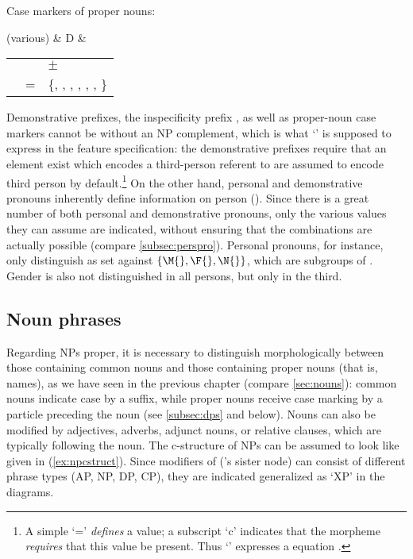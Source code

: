 \a\label{ex:dmorphlex-propn}Case markers of proper nouns:\medskip	
	
	\begin{tabu} {}
	(various)
		& D
		& \begin{tabular}[t]{l l l}
			\ups{\Anim} & \req{} & $\pm$ \\
			\ups{\Case} & = & \{\Aarg{}, \Parg{}, \Dat{}, \Gen{}, 
				\Loc{}, \Ins{}, \Caus{}\} \\
		\end{tabular}
	\end{tabu}\medskip
	
\xe

Demonstrative prefixes, the inspecificity prefix , as well as 
proper-noun case markers cannot be without an NP complement, which is what 
`\req{}' is supposed to express in the feature specification: the demonstrative 
prefixes require that an element exist which encodes a third-person referent to 
are assumed to encode third person by default.\footnote{A simple `=' 
\emph{defines} a value; a subscript `c' indicates that the morpheme 
\emph{requires} that this value be present. Thus `\req{}' expresses a 
 equation \citep[59--61]{bresnan2016}.} On the other hand, 
personal and demonstrative pronouns inherently define information on person 
(\Pers{}). Since there is a great number of both personal and demonstrative 
pronouns, only the various values they can assume are indicated, without 
ensuring that the combinations are actually possible (compare 
\autoref{subsec:perspro}). Personal pronouns, for instance, only distinguish 
\Inan{} as set against $\{\M{}, \F{}, \N{}\}$, which are subgroups of \An{}. 
Gender is also not distinguished in all persons, but only in the third.

\subsection{Noun phrases}

Regarding NPs proper, it is necessary to distinguish morphologically between 
those containing common nouns and those containing proper nouns (that is,  
names), as we have seen in the previous chapter (compare \autoref{sec:nouns}): 
common nouns indicate case by a suffix, while proper nouns receive case marking 
by a particle preceding the noun (see \autoref{subsec:dps} and below). Nouns 
can also be modified by adjectives, adverbs, adjunct nouns, or relative 
clauses, which are typically following the noun. The c-structure of NPs can be 
assumed to look like given in (\ref{ex:npcstruct}). Since modifiers of 
 ('s sister node) can consist of different phrase types (AP, 
NP, DP, CP), they are indicated generalized as `XP' in the diagrams.

